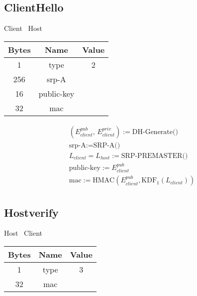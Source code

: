 \subsection{ClientHello}

\begin{center}
    Client \textrightarrow\ Host\\
    \begin{tabular}{|c|c|c|}
        \hline
        \textbf{Bytes} & \textbf{Name} & \textbf{Value} \\
        \hline
        1              & type          & 2              \\
        \hline
        256            & srp-A         &                \\
        \hline
        16             & public-key    &                \\
        \hline
        32             & mac           &                \\
        \hline
    \end{tabular}
\end{center}

\begin{align*}
    & (E_{client}^{pub},\, E_{client}^{priv}) := \text{DH-Generate()}\\
    & \text{srp-A} := \text{SRP-A()}\\
    & L_{client} = L_{host} := \text{SRP-PREMASTER()}\\
    & \text{public-key} := E_{client}^{pub}\\
    & \text{mac} := \text{HMAC}(E_{client}^{pub}, \text{KDF}_1(L_{client}))\\
\end{align*}

\subsection{Hostverify}

\begin{center}
    Host \textrightarrow\ Client\\
    \begin{tabular}{|c|c|c|}
        \hline
        \textbf{Bytes} & \textbf{Name} & \textbf{Value} \\
        \hline
        1              & type          & 3              \\
        \hline
        32             & mac           &                \\
        \hline
    \end{tabular}
\end{center}

